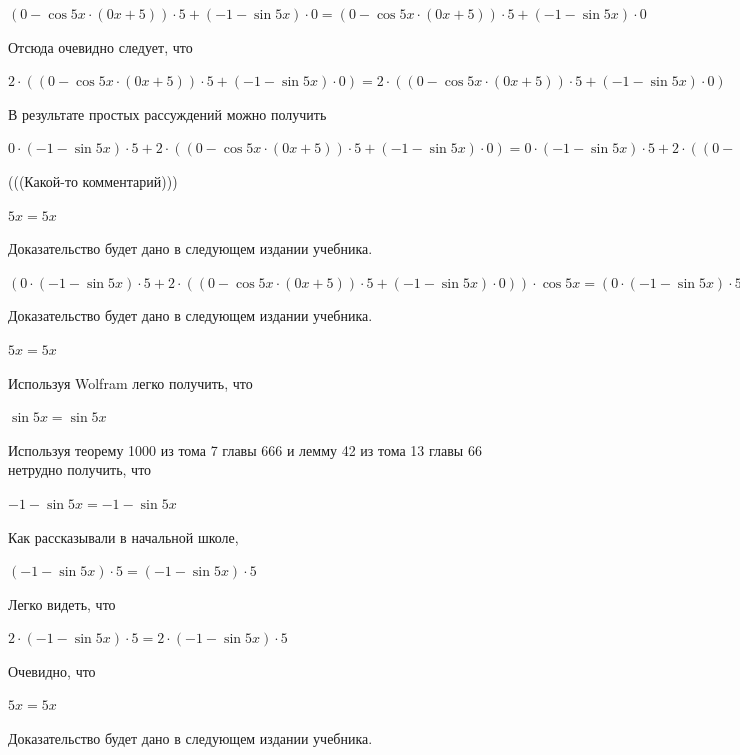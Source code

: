 \documentclass[12pt,a4paper,fleqn]{article}
\theoremstyle{definition}
\begin{document}
$( 0  - \cos 5  x  \cdot ( 0  x  +  5 )) \cdot  5  + ( -1  - \sin 5  x ) \cdot  0  = ( 0  - \cos 5  x  \cdot ( 0  x  +  5 )) \cdot  5  + ( -1  - \sin 5  x ) \cdot  0 $

Отсюда очевидно следует, что 

$ 2  \cdot (( 0  - \cos 5  x  \cdot ( 0  x  +  5 )) \cdot  5  + ( -1  - \sin 5  x ) \cdot  0 ) =  2  \cdot (( 0  - \cos 5  x  \cdot ( 0  x  +  5 )) \cdot  5  + ( -1  - \sin 5  x ) \cdot  0 )$

В результате простых рассуждений можно получить 

$ 0  \cdot ( -1  - \sin 5  x ) \cdot  5  +  2  \cdot (( 0  - \cos 5  x  \cdot ( 0  x  +  5 )) \cdot  5  + ( -1  - \sin 5  x ) \cdot  0 ) =  0  \cdot ( -1  - \sin 5  x ) \cdot  5  +  2  \cdot (( 0  - \cos 5  x  \cdot ( 0  x  +  5 )) \cdot  5  + ( -1  - \sin 5  x ) \cdot  0 )$

(((Какой-то комментарий))) 

$ 5  x  =  5  x $

Доказательство будет дано в следующем издании учебника. 

$( 0  \cdot ( -1  - \sin 5  x ) \cdot  5  +  2  \cdot (( 0  - \cos 5  x  \cdot ( 0  x  +  5 )) \cdot  5  + ( -1  - \sin 5  x ) \cdot  0 )) \cdot \cos 5  x  = ( 0  \cdot ( -1  - \sin 5  x ) \cdot  5  +  2  \cdot (( 0  - \cos 5  x  \cdot ( 0  x  +  5 )) \cdot  5  + ( -1  - \sin 5  x ) \cdot  0 )) \cdot \cos 5  x $

Доказательство будет дано в следующем издании учебника. 

$ 5  x  =  5  x $

Используя Wolfram легко получить, что 

$\sin 5  x  = \sin 5  x $

Используя теорему 1000 из тома 7 главы 666 и лемму 42 из тома 13 главы 66 нетрудно получить, что 

$ -1  - \sin 5  x  =  -1  - \sin 5  x $

Как рассказывали в начальной школе, 

$( -1  - \sin 5  x ) \cdot  5  = ( -1  - \sin 5  x ) \cdot  5 $

Легко видеть, что 

$ 2  \cdot ( -1  - \sin 5  x ) \cdot  5  =  2  \cdot ( -1  - \sin 5  x ) \cdot  5 $

Очевидно, что 

$ 5  x  =  5  x $

Доказательство будет дано в следующем издании учебника. 
\end{document}

